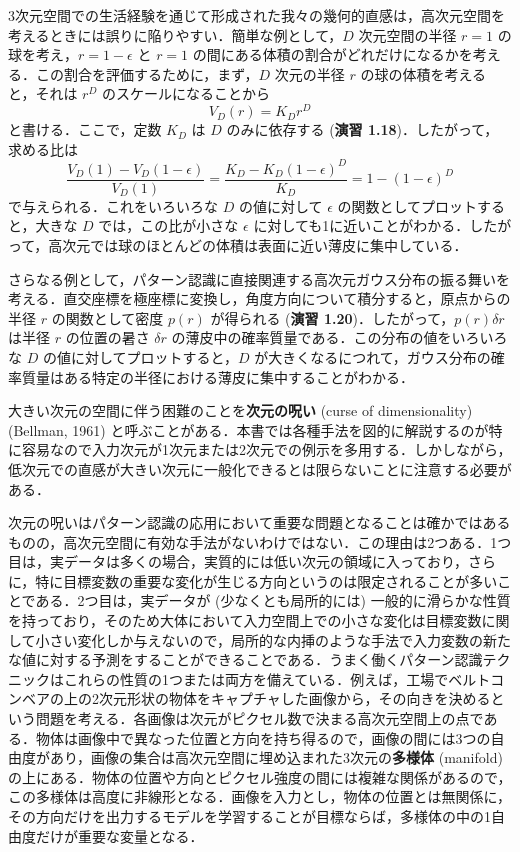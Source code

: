 \documentclass[uplatex,a4paper,oneside,openany,dvipdfmx]{jsarticle}
\numberwithin{equation}{section}
\theoremstyle{mystyle} %
\newcommand{\tb}[1]{\textbf{#1}}
\begin{document}
3次元空間での生活経験を通じて形成された我々の幾何的直感は，高次元空間を考えるときには誤りに陥りやすい．簡単な例として，$D$ 次元空間の半径 $r=1$ の球を考え，$r=1-\epsilon$ と $r=1$ の間にある体積の割合がどれだけになるかを考える．この割合を評価するために，まず，$D$ 次元の半径 $r$ の球の体積を考えると，それは $r^{D}$ のスケールになることから
\begin{equation} \label{eq:1.75}
    V_{D}(r) = K_{D}r^{D}
\end{equation}
と書ける．ここで，定数 $K_{D}$ は $D$ のみに依存する (\tb{演習 1.18})．したがって，求める比は
\begin{equation} \label{eq:1.76}
    \frac{V_{D}(1) - V_{D}(1-\epsilon)}{V_{D}(1)} = \frac{K_{D} - K_{D}(1-\epsilon)^{D}}{K_{D}} = 1 - (1-\epsilon)^{D}
\end{equation}
で与えられる．これをいろいろな $D$ の値に対して $\epsilon$ の関数としてプロットすると，大きな $D$ では，この比が小さな $\epsilon$ に対しても1に近いことがわかる．したがって，高次元では球のほとんどの体積は表面に近い薄皮に集中している．

さらなる例として，パターン認識に直接関連する高次元ガウス分布の振る舞いを考える．直交座標を極座標に変換し，角度方向について積分すると，原点からの半径 $r$ の関数として密度 $p(r)$ が得られる (\tb{演習 1.20})．したがって，$p(r) \delta r$ は半径 $r$ の位置の暑さ $\delta r$ の薄皮中の確率質量である．この分布の値をいろいろな $D$ の値に対してプロットすると，$D$ が大きくなるにつれて，ガウス分布の確率質量はある特定の半径における薄皮に集中することがわかる．

大きい次元の空間に伴う困難のことを\tb{次元の呪い} (curse of dimensionality) (Bellman, 1961) と呼ぶことがある．本書では各種手法を図的に解説するのが特に容易なので入力次元が1次元または2次元での例示を多用する．しかしながら，低次元での直感が大きい次元に一般化できるとは限らないことに注意する必要がある．

次元の呪いはパターン認識の応用において重要な問題となることは確かではあるものの，高次元空間に有効な手法がないわけではない．この理由は2つある．1つ目は，実データは多くの場合，実質的には低い次元の領域に入っており，さらに，特に目標変数の重要な変化が生じる方向というのは限定されることが多いことである．2つ目は，実データが (少なくとも局所的には) 一般的に滑らかな性質を持っており，そのため大体において入力空間上での小さな変化は目標変数に関して小さい変化しか与えないので，局所的な内挿のような手法で入力変数の新たな値に対する予測をすることができることである．うまく働くパターン認識テクニックはこれらの性質の1つまたは両方を備えている．例えば，工場でベルトコンベアの上の2次元形状の物体をキャプチャした画像から，その向きを決めるという問題を考える．各画像は次元がピクセル数で決まる高次元空間上の点である．物体は画像中で異なった位置と方向を持ち得るので，画像の間には3つの自由度があり，画像の集合は高次元空間に埋め込まれた3次元の\tb{多様体} (manifold) の上にある．物体の位置や方向とピクセル強度の間には複雑な関係があるので，この多様体は高度に非線形となる．画像を入力とし，物体の位置とは無関係に，その方向だけを出力するモデルを学習することが目標ならば，多様体の中の1自由度だけが重要な変量となる．
\end{document}
